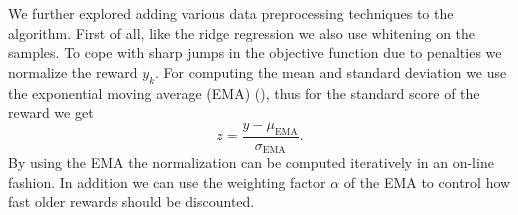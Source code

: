 We further explored adding various data preprocessing techniques
to the algorithm.
First of all, like the ridge regression we also use whitening on the samples.
To cope with sharp jumps in the objective function due to penalties
we normalize the reward $y_k$.
For computing the mean and standard deviation
we use the exponential moving average (EMA) (),
thus for the standard score of the reward we get 
\begin{equation*}
  \label{eq:norm}
  z = \frac{y - \mu_{\text{EMA}}}{\sigma_{\text{EMA}}}.
\end{equation*}
By using the EMA the normalization can be computed iteratively
in an on-line fashion. In addition we can use the
weighting factor $\alpha$ of the EMA to control how fast
older rewards should be discounted.


